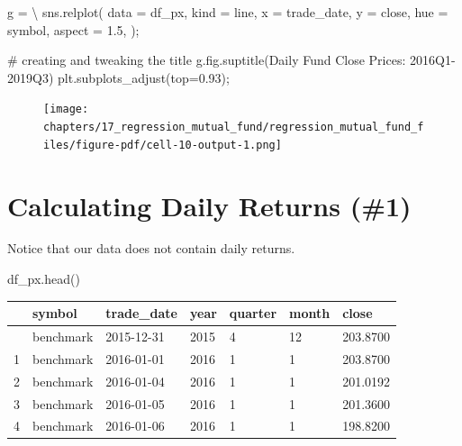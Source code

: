 \documentclass[
  letterpaper,
  DIV=11,
  numbers=noendperiod]{scrreprt}
\newenvironment{Shaded}{\begin{snugshade}}{\end{snugshade}}
\newcommand{\CommentTok}[1]{\textcolor[rgb]{0.37,0.37,0.37}{#1}}
\newcommand{\FloatTok}[1]{\textcolor[rgb]{0.68,0.00,0.00}{#1}}
\newcommand{\NormalTok}[1]{\textcolor[rgb]{0.00,0.23,0.31}{#1}}
\newcommand{\OperatorTok}[1]{\textcolor[rgb]{0.37,0.37,0.37}{#1}}
\newcommand{\StringTok}[1]{\textcolor[rgb]{0.13,0.47,0.30}{#1}}
\begin{document}
\begin{Shaded}
\begin{Highlighting}[]
\NormalTok{g }\OperatorTok{=} \OperatorTok{\textbackslash{}}
\NormalTok{sns.relplot(}
\NormalTok{    data }\OperatorTok{=}\NormalTok{ df\_px, kind }\OperatorTok{=} \StringTok{\textquotesingle{}line\textquotesingle{}}\NormalTok{,}
\NormalTok{    x }\OperatorTok{=} \StringTok{\textquotesingle{}trade\_date\textquotesingle{}}\NormalTok{, y }\OperatorTok{=} \StringTok{\textquotesingle{}close\textquotesingle{}}\NormalTok{, hue }\OperatorTok{=} \StringTok{\textquotesingle{}symbol\textquotesingle{}}\NormalTok{,}
\NormalTok{    aspect }\OperatorTok{=} \FloatTok{1.5}\NormalTok{,}
\NormalTok{)}\OperatorTok{;}

\CommentTok{\# creating and tweaking the title}
\NormalTok{g.fig.suptitle(}\StringTok{\textquotesingle{}Daily Fund Close Prices: 2016Q1{-}2019Q3\textquotesingle{}}\NormalTok{)}
\NormalTok{plt.subplots\_adjust(top}\OperatorTok{=}\FloatTok{0.93}\NormalTok{)}\OperatorTok{;}
\end{Highlighting}
\end{Shaded}

\begin{figure}[H]

{\centering \texttt{[image: chapters/17\_regression\_mutual\_fund/regression\_mutual\_fund\_files/figure-pdf/cell-10-output-1.png]}

}

\end{figure}

\hypertarget{calculating-daily-returns-1}{%
\section{Calculating Daily Returns
(\#1)}\label{calculating-daily-returns-1}}

Notice that our data does not contain daily returns.

\begin{Shaded}
\begin{Highlighting}[]
\NormalTok{df\_px.head()}
\end{Highlighting}
\end{Shaded}

\begin{longtable}[]{@{}lllllll@{}}
\toprule\noalign{}
& symbol & trade\_date & year & quarter & month & close \\
\midrule\noalign{}
\endhead
\bottomrule\noalign{}
\endlastfoot
0 & benchmark & 2015-12-31 & 2015 & 4 & 12 & 203.8700 \\
1 & benchmark & 2016-01-01 & 2016 & 1 & 1 & 203.8700 \\
2 & benchmark & 2016-01-04 & 2016 & 1 & 1 & 201.0192 \\
3 & benchmark & 2016-01-05 & 2016 & 1 & 1 & 201.3600 \\
4 & benchmark & 2016-01-06 & 2016 & 1 & 1 & 198.8200 \\
\end{longtable}
\end{document}
